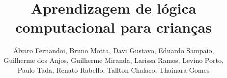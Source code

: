 \sloppy

\title{Aprendizagem de lógica computacional para crianças}

\author{Álvaro Fernandoi, Bruno Motta, Davi Gustavo, Eduardo Sampaio,\\ Guilherme dos Anjos, Guilherme Miranda, Larissa Ramos, Levino Porto,\\ Paulo Tada, Renato Rabello, Tallton Chalaco, Thainara Gomes}

\address{Faculdade Gama - Universidade de Brasília (UnB)}

